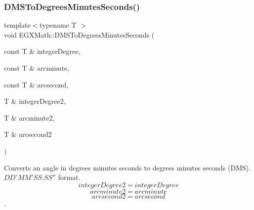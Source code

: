 \mbox{\label{group___e_g_x_math-_angle_conversions-_d_m_s_gae8804d622399df85d60c0c8bb5c6ebc5}} 
\subsubsection{\texorpdfstring{D\+M\+S\+To\+Degrees\+Minutes\+Seconds()}{DMSToDegreesMinutesSeconds()}}
{\footnotesize\ttfamily template$<$typename T $>$ \\
void E\+G\+X\+Math\+::\+D\+M\+S\+To\+Degrees\+Minutes\+Seconds (\begin{DoxyParamCaption}\item[{const T \&}]{integer\+Degree,  }\item[{const T \&}]{arcminute,  }\item[{const T \&}]{arcsecond,  }\item[{T \&}]{integer\+Degree2,  }\item[{T \&}]{arcminute2,  }\item[{T \&}]{arcsecond2 }\end{DoxyParamCaption})}



Converts an angle in degrees minutes seconds to degrees minutes seconds (D\+MS). ${DD}^{\circ}{MM}'{SS.SS}''$ format. \[integerDegree2 = integerDegree \] \[arcminute2 = arcminute\] \[arcsecond2 = arcsecond\]. 

